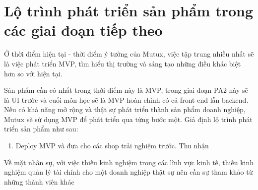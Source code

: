\section{Lộ trình phát triển sản phẩm trong các giai đoạn tiếp theo}
Ở thời điểm hiện tại - thời điểm ý tưởng của Mutux, việc tập trung nhiều nhất sẽ là việc phát triển MVP, tìm hiểu thị trường và sáng tạo những điều khác biệt hơn so với hiện tại. 

Sản phẩm cần có nhất trong thời điểm này là MVP, trong giai đoạn PA2 này sẽ là UI trước và cuối môn học sẽ là MVP hoàn chỉnh có cả front end lẫn backend. Nếu có khả năng mở rộng và thật sự phát triển thành sản phẩm doanh nghiệp, Mutux sẽ sử dụng MVP để phát triển qua từng bước một. Giả định lộ trình phát triển sản phẩm như sau:

\begin{enumerate}
    \item Deploy MVP và đưa cho các shop trải nghiệm trước. Thu nhận 
\end{enumerate}

Về mặt nhân sự, với việc thiếu kinh nghiệm trong các lĩnh vực kinh tế, thiếu kinh nghiệm quản lý tài chính cho một doanh nghiệp thật sự nên cần sự tham khảo từ những thành viên khác 